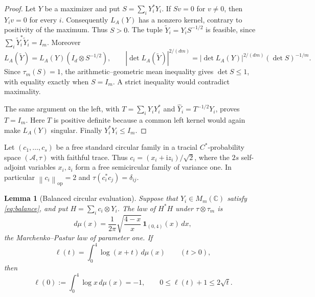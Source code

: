 \documentclass[11pt]{article}
\newtheorem{lemma}[theorem]{Lemma}
\theoremstyle{remark}
\newcommand{\C}{\mathbb C}
\newcommand{\M}{M}
\newcommand{\op}{\mathrm{op}}
\newcommand{\norm}[1]{\left\lVert#1\right\rVert}
\newcommand{\abs}[1]{\left\lvert#1\right\rvert}
\begin{document}
\begin{proof}
Let $Y$ be a maximizer and put $S=\sum_iY_i^*Y_i$.
If $Sv=0$ for $v\ne0$, then $Y_iv=0$ for every $i$.
Consequently $L_A(Y)$ has a nonzero kernel, contrary to positivity
of the maximum. Thus $S>0$. The tuple
$\widetilde Y_i=Y_iS^{-1/2}$ is feasible, since
$\sum_i\widetilde Y_i^*\widetilde Y_i=I_m$. Moreover
\[
 L_A(\widetilde Y)=L_A(Y)(I_d\otimes S^{-1/2}),
 \qquad
 \abs{\det L_A(\widetilde Y)}^{2/(dm)}
   =\abs{\det L_A(Y)}^{2/(dm)}(\det S)^{-1/m}.
\]
Since $\tau_m(S)=1$, the arithmetic--geometric mean inequality
gives $\det S\leq1$, with equality exactly when $S=I_m$.
A strict inequality would contradict maximality.

The same argument on the left, with $T=\sum_iY_iY_i^*$ and
$\widehat Y_i=T^{-1/2}Y_i$, proves $T=I_m$.
Here $T$ is positive definite because a common left kernel would
again make $L_A(Y)$ singular. Finally $Y_i^*Y_i\leq I_m$.
\end{proof}

Let $(c_1,\ldots,c_s)$ be a free standard circular family in a
tracial $C^*$-probability space $(\mathcal A,\tau)$ with faithful
trace. Thus $c_i=(x_i+\mathrm i z_i)/\sqrt2$, where the $2s$
self-adjoint variables $x_i,z_i$ form a free semicircular family
of variance one. In particular $\norm{c_i}_{\op}=2$ and
$\tau(c_i^*c_j)=\delta_{ij}$.

\begin{lemma}[Balanced circular evaluation]\label{lem:circular}
Suppose that $Y_i\in\M_m(\C)$ satisfy \eqref{eq:balance}, and put
$H=\sum_i c_i\otimes Y_i$. The law of $H^*H$ under
$\tau\otimes\tau_m$ is
\begin{equation}
 d\mu(x)=\frac1{2\pi}\sqrt{\frac{4-x}{x}}\,
                  \mathbf1_{(0,4)}(x)\,dx, \label{eq:MP}
\end{equation}
the Marchenko--Pastur law of parameter one. If
\[
 \ell(t)=\int_0^4\log(x+t)\,d\mu(x)\qquad(t>0),
\]
then
\begin{equation}
 \ell(0):=\int_0^4\log x\,d\mu(x)=-1,\qquad
 0\leq\ell(t)+1\leq2\sqrt t. \label{eq:ell}
\end{equation}
\end{lemma}
\end{document}
